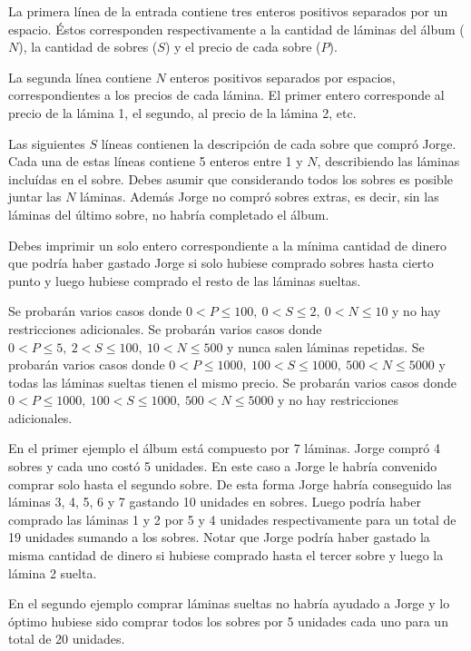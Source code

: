 \documentclass{oci}
\begin{document}
\begin{inputDescription}
La primera línea de la entrada contiene tres enteros positivos separados por un
espacio. Éstos corresponden respectivamente a la cantidad de láminas del álbum
($N$), la cantidad de sobres ($S$) y el precio de cada sobre ($P$).

La segunda línea contiene $N$ enteros positivos separados por espacios,
correspondientes a los precios de cada lámina. El primer entero corresponde al
precio de la lámina 1, el segundo, al precio de la lámina 2, etc.

Las siguientes $S$ líneas contienen la descripción de cada sobre que compró
Jorge. Cada una de estas líneas contiene 5 enteros entre 1 y $N$, describiendo
las láminas incluídas en el sobre. Debes asumir que considerando todos los
sobres es posible juntar las $N$ láminas. Además Jorge no compró sobres extras,
es decir, sin las láminas del último sobre, no habría completado el álbum.
\end{inputDescription}

\begin{outputDescription}
Debes imprimir un solo entero correspondiente a la mínima cantidad de dinero
que podría haber gastado Jorge si solo hubiese comprado sobres hasta cierto
punto y luego hubiese comprado el resto de las láminas sueltas.
\end{outputDescription}

\begin{scoreDescription}
   Se probarán varios casos donde
 $0 < P \leq 100,\ 0 < S \leq 2,\ 0 < N \leq 10$ y no hay restricciones adicionales.
   Se probarán varios casos donde
 $0<P\leq 5,\ 2 < S \leq 100,\ 10 < N \leq 500$ y nunca salen láminas repetidas.
   Se probarán varios casos donde
 $0<P\leq 1000,\ 100 < S \leq 1000,\ 500 < N \leq 5000$ y todas las láminas sueltas tienen el mismo precio.
   Se probarán varios casos donde
 $0<P\leq 1000,\ 100 < S \leq 1000,\ 500<N\leq 5000$ y no hay restricciones adicionales.
\end{scoreDescription}

\begin{sampleDescription}

En el primer ejemplo el álbum está compuesto por 7 láminas. Jorge compró 4
sobres y cada uno costó 5 unidades. En este caso a Jorge le habría convenido
comprar solo hasta el segundo sobre. De esta forma Jorge habría conseguido las
láminas 3, 4, 5, 6 y 7 gastando 10 unidades en sobres. Luego podría haber
comprado las láminas 1 y 2 por 5 y 4 unidades respectivamente para un total de
19 unidades sumando a los sobres. Notar que Jorge podría haber gastado la misma
cantidad de dinero si hubiese comprado hasta el tercer sobre y luego la lámina
2 suelta.

En el segundo ejemplo comprar láminas sueltas no habría ayudado a Jorge y lo
óptimo hubiese sido comprar todos los sobres por 5 unidades cada uno para un
total de 20 unidades.

\end{sampleDescription}
\end{document}
